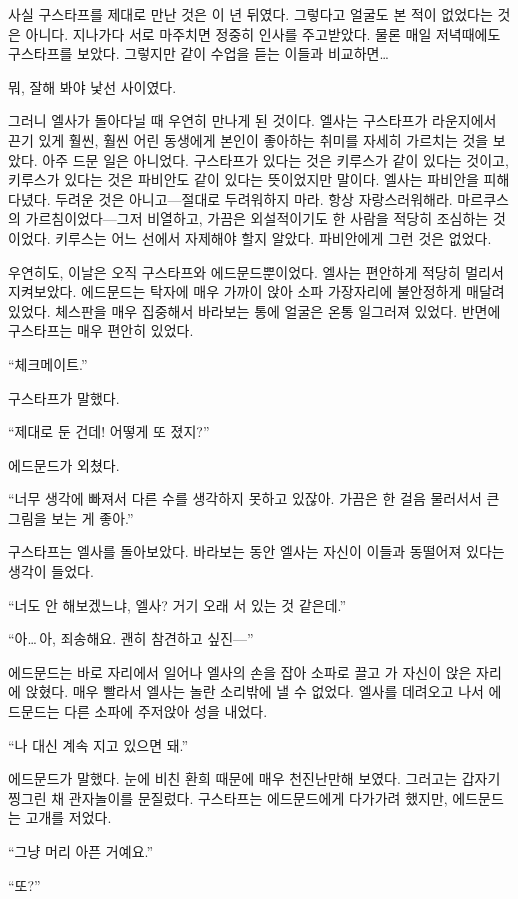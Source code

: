 사실 구스타프를 제대로 만난 것은 이 년 뒤였다. 그렇다고 얼굴도 본 적이 없었다는 것은 아니다. 지나가다 서로 마주치면 정중히 인사를 주고받았다. 물론 매일 저녁때에도 구스타프를 보았다. 그렇지만 같이 수업을 듣는 이들과 비교하면\ldots

뭐, 잘해 봐야 낯선 사이였다.

그러니 엘사가 돌아다닐 때 우연히 만나게 된 것이다. 엘사는 구스타프가 라운지에서 끈기 있게 훨씬, 훨씬 어린 동생에게 본인이 좋아하는 취미를 자세히 가르치는 것을 보았다. 아주 드문 일은 아니었다. 구스타프가 있다는 것은 키루스가 같이 있다는 것이고, 키루스가 있다는 것은 파비안도 같이 있다는 뜻이었지만 말이다. 엘사는 파비안을 피해 다녔다. 두려운 것은 아니고—절대로 두려워하지 마라. 항상 자랑스러워해라. 마르쿠스의 가르침이었다—그저 비열하고, 가끔은 외설적이기도 한 사람을 적당히 조심하는 것이었다. 키루스는 어느 선에서 자제해야 할지 알았다. 파비안에게 그런 것은 없었다.

우연히도, 이날은 오직 구스타프와 에드문드뿐이었다. 엘사는 편안하게 적당히 멀리서 지켜보았다. 에드문드는 탁자에 매우 가까이 앉아 소파 가장자리에 불안정하게 매달려 있었다. 체스판을 매우 집중해서 바라보는 통에 얼굴은 온통 일그러져 있었다. 반면에 구스타프는 매우 편안히 있었다.

``체크메이트.''

구스타프가 말했다.

``제대로 둔 건데! 어떻게 또 졌지?''

에드문드가 외쳤다.

``너무 생각에 빠져서 다른 수를 생각하지 못하고 있잖아. 가끔은 한 걸음 물러서서 큰 그림을 보는 게 좋아.''

구스타프는 엘사를 돌아보았다. 바라보는 동안 엘사는 자신이 이들과 동떨어져 있다는 생각이 들었다.

``너도 안 해보겠느냐, 엘사? 거기 오래 서 있는 것 같은데.''

``아\ldots\,아, 죄송해요. 괜히 참견하고 싶진—''

에드문드는 바로 자리에서 일어나 엘사의 손을 잡아 소파로 끌고 가 자신이 앉은 자리에 앉혔다. 매우 빨라서 엘사는 놀란 소리밖에 낼 수 없었다. 엘사를 데려오고 나서 에드문드는 다른 소파에 주저앉아 성을 내었다.

``나 대신 계속 지고 있으면 돼.''

에드문드가 말했다. 눈에 비친 환희 때문에 매우 천진난만해 보였다. 그러고는 갑자기 찡그린 채 관자놀이를 문질렀다. 구스타프는 에드문드에게 다가가려 했지만, 에드문드는 고개를 저었다.

``그냥 머리 아픈 거예요.''

``또?''

